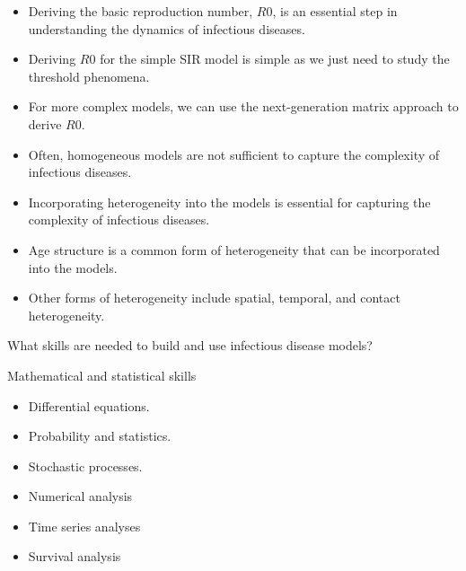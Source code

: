 \documentclass[
  ignorenonframetext,
]{beamer}
\providecommand{\tightlist}{%
  \setlength{\itemsep}{0pt}\setlength{\parskip}{0pt}}\usepackage{longtable,booktabs,array}
\begin{document}
\begin{frame}
\begin{itemize}
\item
  Deriving the basic reproduction number, \(R0\), is an essential step
  in understanding the dynamics of infectious diseases.
\item
  Deriving \(R0\) for the simple SIR model is simple as we just need to
  study the threshold phenomena.
\item
  For more complex models, we can use the next-generation matrix
  approach to derive \(R0\).
\end{itemize}
\end{frame}

\begin{frame}
\begin{itemize}
\item
  Often, homogeneous models are not sufficient to capture the complexity
  of infectious diseases.
\item
  Incorporating heterogeneity into the models is essential for capturing
  the complexity of infectious diseases.
\item
  Age structure is a common form of heterogeneity that can be
  incorporated into the models.
\item
  Other forms of heterogeneity include spatial, temporal, and contact
  heterogeneity.
\end{itemize}
\end{frame}

\begin{frame}
\begin{block}{What skills are needed to build and use infectious disease
models?}
\label{what-skills-are-needed-to-build-and-use-infectious-disease-models}
\begin{block}{Mathematical and statistical skills}
\label{mathematical-and-statistical-skills}
\begin{itemize}
\tightlist
\item
  Differential equations.
\item
  Probability and statistics.
\item
  Stochastic processes.
\item
  Numerical analysis
\item
  Time series analyses
\item
  Survival analysis
\end{itemize}
\end{block}
\end{block}
\end{frame}
\end{document}
